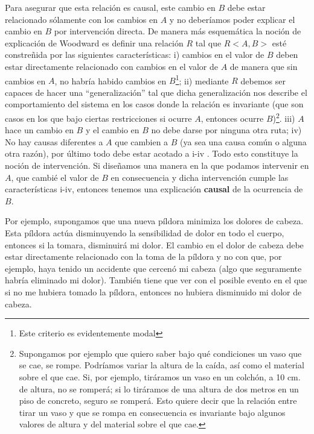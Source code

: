 {Para asegurar que esta relación es causal, este cambio en $B$ debe estar relacionado sólamente con los cambios en $A$ y no deberíamos poder explicar el cambio en $B$ por intervención directa. De manera más esquemática la noción de explicación de Woodward es definir una relación $R$ tal que $R<A, B>$ esté constreñida por las siguientes características: i) cambios en el valor de $B$ deben estar directamente relacionado con cambios en el valor de $A$ de manera que sin cambios en $A$, no habría habido cambios en $B$\footnote{Este criterio es evidentemente modal}; ii) mediante $R$ debemos ser capaces de hacer una ``generalización'' tal que dicha generalización nos describe el comportamiento del sistema en los casos donde la relación es invariante (que son casos en los que bajo ciertas restricciones si ocurre $A$, entonces ocurre $B$)\footnote{Supongamos por ejemplo que quiero saber bajo qué condiciones un vaso que se cae, se rompe. Podríamos variar la altura de la caída, así como el material sobre el que cae. Si, por ejemplo, tiráramos un vaso en un colchón, a 10 cm. de altura, no se romperá; si lo tiráramos de una altura de dos metros en un piso de concreto, seguro se romperá. Esto quiere decir que la relación entre tirar un vaso y que se rompa en consecuencia es invariante bajo algunos valores de altura y del material sobre el que cae.}.  iii) $A$ hace un cambio en $B$ y el cambio en $B$ no debe darse por ninguna otra ruta; iv) No hay causas diferentes a $A$ que cambien a $B$ (ya sea una causa común o alguna otra razón), por último todo debe estar acotado a i-iv \cite[p. 201]{Woodward2000}. Todo esto constituye la noción de intervención. Si diseñamos una manera en la que podamos intervenir en $A$, que cambié el valor de $B$ en consecuencia y dicha intervención cumple las características i-iv, entonces tenemos una explicación \textbf{causal} de la ocurrencia de $B$.

Por ejemplo, supongamos que una nueva píldora minimiza los dolores de cabeza. Esta píldora actúa disminuyendo la sensibilidad de dolor en todo el cuerpo, entonces si la tomara, disminuirá mi dolor. El cambio en el dolor de cabeza debe estar directamente relacionado con la toma de la píldora y no con que, por ejemplo, haya tenido un accidente que cercenó mi cabeza (algo que seguramente habría eliminado mi dolor). También tiene que ver con el posible evento en el que si no me hubiera tomado la píldora, entonces no hubiera disminuido mi dolor de cabeza.

}
